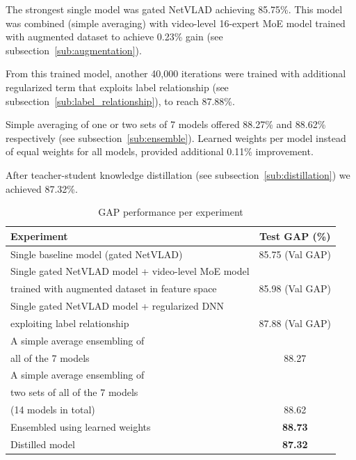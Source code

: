 \documentclass[runningheads]{llncs}
\begin{document}
The strongest single model was gated NetVLAD achieving 85.75\%.
This model was combined (simple averaging) with video-level 16-expert MoE model trained with augmented dataset to achieve 0.23\% gain (see subsection~\ref{sub:augmentation}).

From this trained model, another 40,000 iterations were trained with additional regularized term that exploits label relationship (see subsection~\ref{sub:label_relationship}), to reach 87.88\%.

Simple averaging of one or two sets of 7 models offered 88.27\% and 88.62\% respectively (see subsection~\ref{sub:ensemble}).
Learned weights per model instead of equal weights for all models, provided additional 0.11\% improvement.

After teacher-student knowledge distillation (see subsection~\ref{sub:distillation}) we achieved 87.32\%.

\begin{table}[h!]
  \begin{center}
    \caption{GAP performance per experiment}
    \label{tab:gap}
    \begin{tabular}{l|c} %
            \textbf{Experiment} & \textbf{Test GAP (\%)} \\
      \hline
      \hline
            Single baseline model (gated NetVLAD) & 85.75 (Val GAP) \\
      \hline
            Single gated NetVLAD model + video-level MoE model \\
            trained with augmented dataset in feature space & 85.98 (Val GAP) \\
      \hline
            Single gated NetVLAD model + regularized DNN \\
            exploiting label relationship & 87.88 (Val GAP) \\
      \hline
      A simple average ensembling of \\ all of the 7 models & 88.27 \\
      \hline
      A simple average ensembling of \\ two sets of all of the 7 models \\ (14 models in total) & 88.62  \\
      \hline
            Ensembled using learned weights &  \textbf{88.73} \\
      \hline
            Distilled model & \textbf{87.32} \\
    \end{tabular}
  \end{center}
\end{table}
\end{document}
